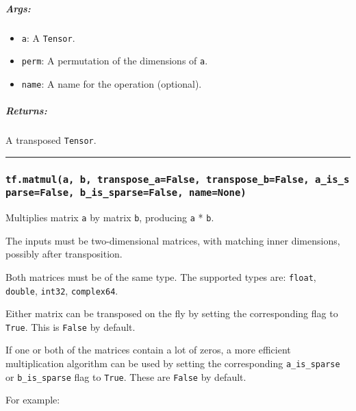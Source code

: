 \subparagraph{Args: }\label{args-24}

\begin{itemize}
\tightlist
\item
  \texttt{a}: A \texttt{Tensor}.
\item
  \texttt{perm}: A permutation of the dimensions of \texttt{a}.
\item
  \texttt{name}: A name for the operation (optional).
\end{itemize}

\subparagraph{Returns: }\label{returns-24}

A transposed \texttt{Tensor}.

\begin{center}\rule{0.5\linewidth}{\linethickness}\end{center}

\subsubsection{\texorpdfstring{\texttt{tf.matmul(a,\ b,\ transpose\_a=False,\ transpose\_b=False,\ a\_is\_sparse=False,\ b\_is\_sparse=False,\ name=None)}
}{tf.matmul(a, b, transpose\_a=False, transpose\_b=False, a\_is\_sparse=False, b\_is\_sparse=False, name=None) }}\label{tf.matmula-b-transposeux5fafalse-transposeux5fbfalse-aux5fisux5fsparsefalse-bux5fisux5fsparsefalse-namenone}

Multiplies matrix \texttt{a} by matrix \texttt{b}, producing \texttt{a}
* \texttt{b}.

The inputs must be two-dimensional matrices, with matching inner
dimensions, possibly after transposition.

Both matrices must be of the same type. The supported types are:
\texttt{float}, \texttt{double}, \texttt{int32}, \texttt{complex64}.

Either matrix can be transposed on the fly by setting the corresponding
flag to \texttt{True}. This is \texttt{False} by default.

If one or both of the matrices contain a lot of zeros, a more efficient
multiplication algorithm can be used by setting the corresponding
\texttt{a\_is\_sparse} or \texttt{b\_is\_sparse} flag to \texttt{True}.
These are \texttt{False} by default.

For example:

